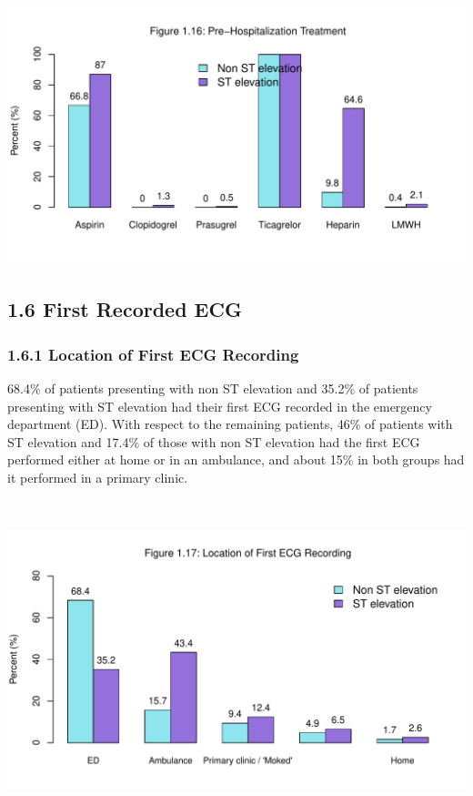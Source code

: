 \documentclass[
]{article}
\begin{document}
\includegraphics{‏‏ACSIS_2024_v1_pdf_without_files/figure-latex/unnamed-chunk-55-1.pdf}

\pagebreak

\subsection{1.6 First Recorded ECG}\label{first-recorded-ecg}

\subsubsection{1.6.1 Location of First ECG
Recording}\label{location-of-first-ecg-recording}

68.4\% of patients presenting with non ST elevation and 35.2\% of
patients presenting with ST elevation had their first ECG recorded in
the emergency department (ED). With respect to the remaining patients,
46\% of patients with ST elevation and 17.4\% of those with non ST
elevation had the first ECG performed either at home or in an ambulance,
and about 15\% in both groups had it performed in a primary clinic.

~

\includegraphics{‏‏ACSIS_2024_v1_pdf_without_files/figure-latex/unnamed-chunk-56-1.pdf}
\end{document}
